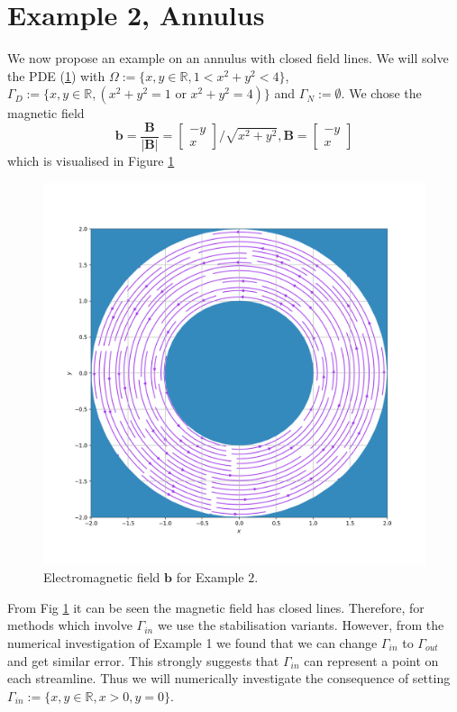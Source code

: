 \documentclass[12pt]{ociamthesis}
\begin{document}
\section{Example 2, Annulus}
We now propose an example on an annulus with closed field lines.
We will solve the PDE (\ref{}) with $\Omega := \{x,y \in \mathbb{R}, 1<x^2+y^2<4\}$, $\Gamma_D := \{x,y \in \mathbb{R}, (x^2+y^2=1 \text{ or } x^2+y^2=4)\}$ and $\Gamma_N := \emptyset$. We chose the magnetic field 
\begin{equation}
\mathbf{b} = \frac{\mathbf{B}}{|\mathbf{B}|} = 
\left[ \begin{matrix}
-y\\
 x
\end{matrix} \right]/\sqrt{x^2+y^2}, 
\mathbf{B} = \left[ \begin{matrix}
-y\\
 x
\end{matrix} \right]
\end{equation}
which is visualised in Figure \ref{E2_VF}
\begin{figure}[H]
 \includegraphics[width=\textwidth]{Pics/VectorField/E2b.png}
  \caption{Electromagnetic field $\mathbf{b}$ for Example $2$.}
 \label{E2_VF}
\end{figure}

From Fig \ref{E2_VF} it can be seen the magnetic field has closed lines. Therefore, for methods which involve $\Gamma_{in}$ we use the stabilisation variants. However, from the numerical investigation of Example 1 we found that we can change $\Gamma_{in}$ to $\Gamma_{out}$ and get similar error. This strongly suggests that $\Gamma_{in}$ can represent a point on each streamline. Thus we will numerically investigate the consequence of setting $\Gamma_{in}:=\{x,y \in \mathbb{R}, x>0, y=0\}$.
\end{document}
